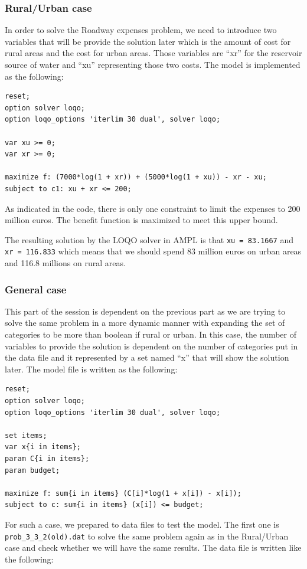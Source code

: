 \subsubsection{Rural/Urban case}
In order to solve the Roadway expenses problem, we need to introduce two variables that will be provide the solution later which is the amount of cost for rural areas and the cost for urban areas. Those variables are ``xr'' for the reservoir source of water and ``xu'' representing those two costs. The model is implemented as the following:
\begin{verbatim}
reset;
option solver loqo;
option loqo_options 'iterlim 30 dual', solver loqo;

var xu >= 0;
var xr >= 0;

maximize f: (7000*log(1 + xr)) + (5000*log(1 + xu)) - xr - xu;
subject to c1: xu + xr <= 200;
\end{verbatim}
As indicated in the code, there is only one constraint to limit the expenses to 200 million euros. The benefit function is maximized to meet this upper bound.

The resulting solution by the LOQO solver in AMPL is that \texttt{xu = 83.1667} and \texttt{xr = 116.833} which means that we should spend 83 million euros on urban areas and 116.8 millions on rural areas.

\subsubsection{General case}
This part of the session is dependent on the previous part as we are trying to solve the same problem in a more dynamic manner with expanding the set of categories to be more than boolean if rural or urban. In this case, the number of variables to provide the solution is dependent on the number of categories put in the data file and it represented by a set named ``x'' that will show the solution later. The model file is written as the following:
\begin{verbatim}
reset;
option solver loqo;
option loqo_options 'iterlim 30 dual', solver loqo;

set items;
var x{i in items};
param C{i in items};
param budget;

maximize f: sum{i in items} (C[i]*log(1 + x[i]) - x[i]);
subject to c: sum{i in items} (x[i]) <= budget;
\end{verbatim}
For such a case, we prepared to data files to test the model. The first one is \texttt{prob\_3\_3\_2(old).dat} to solve the same problem again as in the Rural/Urban case and check whether we will have the same results. The data file is written like the following:

